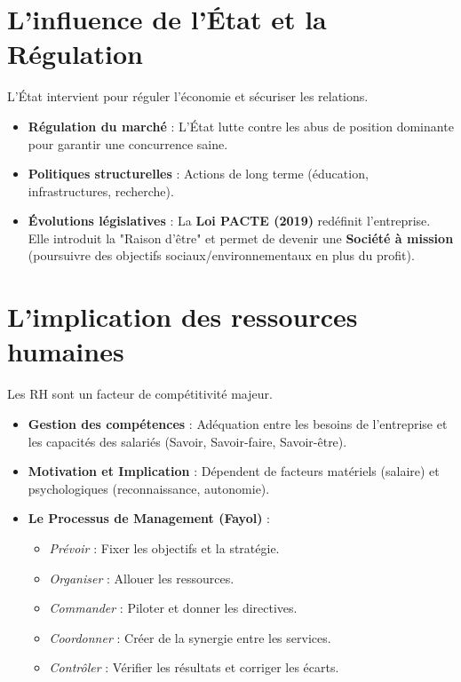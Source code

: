\documentclass[11pt,a4paper]{article}
\begin{document}
\section{L'influence de l'État et la Régulation}
L'État intervient pour réguler l'économie et sécuriser les relations.
\begin{itemize}[label=$\bullet$]
    \item \textbf{Régulation du marché} : L'État lutte contre les abus de position dominante pour garantir une concurrence saine.
    \item \textbf{Politiques structurelles} : Actions de long terme (éducation, infrastructures, recherche).
    \item \textbf{Évolutions législatives} : La \textbf{Loi PACTE (2019)} redéfinit l'entreprise. Elle introduit la "Raison d'être" et permet de devenir une \textbf{Société à mission} (poursuivre des objectifs sociaux/environnementaux en plus du profit).
\end{itemize}

\section{L'implication des ressources humaines}
Les RH sont un facteur de compétitivité majeur.
\begin{itemize}[label=$\bullet$]
    \item \textbf{Gestion des compétences} : Adéquation entre les besoins de l'entreprise et les capacités des salariés (Savoir, Savoir-faire, Savoir-être).
    \item \textbf{Motivation et Implication} : Dépendent de facteurs matériels (salaire) et psychologiques (reconnaissance, autonomie).
    \item \textbf{Le Processus de Management (Fayol)} :
    \begin{itemize}
        \item \textit{Prévoir} : Fixer les objectifs et la stratégie.
        \item \textit{Organiser} : Allouer les ressources.
        \item \textit{Commander} : Piloter et donner les directives.
        \item \textit{Coordonner} : Créer de la synergie entre les services.
        \item \textit{Contrôler} : Vérifier les résultats et corriger les écarts.
    \end{itemize}
\end{itemize}
\end{document}
